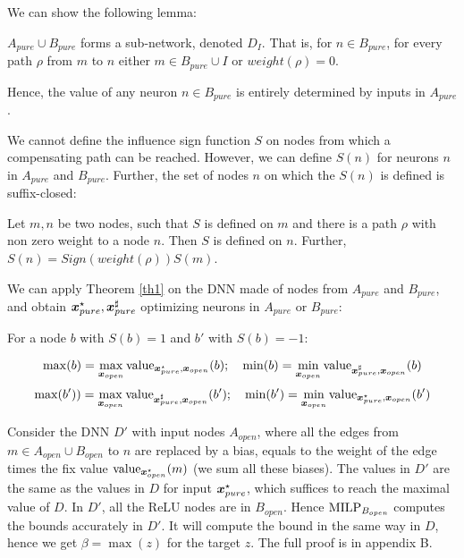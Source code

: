 We can show the following lemma:

\begin{lemma}
	$A_{pure} \cup B_{pure} $ forms a sub-network, denoted $D_I$. That is, 
	for $n \in B_{pure}$, for every path $\rho$ from $m$ to $n$
	either $m \in B_{pure}\cup I$ or $weight(\rho)=0$.
\end{lemma}

Hence, the value of any neuron $n \in B_{pure}$ is entirely determined by 
inputs in $A_{pure}$. 


We cannot define the influence sign function $S$ on nodes from which a compensating path can be reached. However, we can define $S(n)$ for neurons $n$ in $A_{pure}$ and $B_{pure}$.
Further, the set of nodes $n$ on which the $S(n)$ is defined is suffix-closed:

\begin{lemma}
	Let $m,n$ be two nodes, such that $S$ is defined on $m$ and there is a path $\rho$ with non zero weight to a node $n$. Then $S$ is defined on $n$.
	Further, $S(n)= Sign(weight(\rho)) S(m)$.
\end{lemma}

We can apply Theorem \ref{th1} on the DNN made of nodes from $A_{pure}$ and $B_{pure}$, and obtain $\boldsymbol{x}_{pure}^\star,\boldsymbol{x}_{pure}^\sharp$ optimizing neurons in $A_{pure}$ or $B_{pure}$:

\begin{proposition}
For a node $b$ with $S(b)=1$ and $b'$ with $S(b)=-1$:

$$\max(b)=\max_{\boldsymbol{x}_{open}} {\textrm{value}}_{\boldsymbol{x}^{\star}_{pure},\boldsymbol{x}_{open}}(b); \quad 
\min(b)=\min_{\boldsymbol{x}_{open}} {\textrm{value}}_{\boldsymbol{x}^{\sharp}_{pure},\boldsymbol{x}_{open}}(b)$$
$$\max(b'))=\max_{\boldsymbol{x}_{open}} {\textrm{value}}_{\boldsymbol{x}^{\sharp}_{pure},\boldsymbol{x}_{open}}(b'); \quad \min(b')=\min_{\boldsymbol{x}_{open}} {\textrm{value}}_{\boldsymbol{x}^{\star}_{pure},\boldsymbol{x}_{open}}(b')$$
\end{proposition}

Consider the DNN $D'$ with input nodes $A_{open}$, where all the 
edges from $m \in A_{open} \cup B_{open}$ to $n$ are replaced by a bias, 
equals to the weight of the edge times the fix value ${\textrm{value}}_{\boldsymbol{x}^\star_{open}}(m)$ (we sum all these biases).
The values in $D'$ are the same as the values in $D$ for input $\boldsymbol{x}^{\star}_{pure}$,
which suffices to reach the maximal value of $D$.
In $D'$, all the ReLU nodes are in $B_{open}$. 
Hence ${\textrm{MILP}}_{B_{open}}$ computes the bounds accurately in $D'$.
It will compute the bound in the same way in $D$, hence we get $\beta=\max(z)$ for the target $z$. The full proof is in appendix B.


